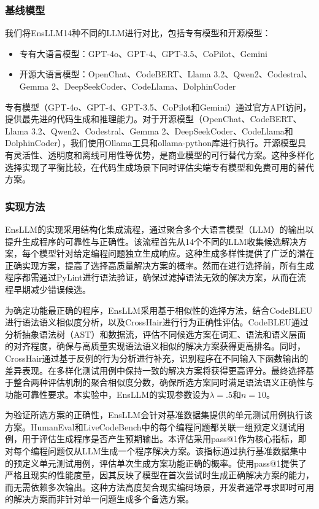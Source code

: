 \documentclass{article}
\newcommand{\tool}{EnsLLM}
\begin{document}
\subsubsection{基线模型}
\leavevmode\par
我们将\tool\与14种不同的LLM进行对比，包括专有模型和开源模型：
\begin{itemize}
    \item 专有大语言模型：GPT-4o、GPT-4、GPT-3.5、CoPilot、Gemini
    \item 开源大语言模型：OpenChat、CodeBERT、Llama 3.2、Qwen2、Codestral、Gemma 2、DeepSeekCoder、CodeLlama、DolphinCoder
\end{itemize}

专有模型（GPT-4o、GPT-4、GPT-3.5、CoPilot和Gemini）通过官方API访问，提供最先进的代码生成和推理能力。对于开源模型（OpenChat、CodeBERT、Llama 3.2、Qwen2、Codestral、Gemma 2、DeepSeekCoder、CodeLlama和DolphinCoder），我们使用Ollama工具和ollama-python库进行执行。开源模型具有灵活性、透明度和离线可用性等优势，是商业模型的可行替代方案。这种多样化选择实现了平衡比较，在代码生成场景下同时评估尖端专有模型和免费可用的替代方案。
\subsubsection{实现方法}
\leavevmode\par
\tool 的实现采用结构化集成流程，通过聚合多个大语言模型（LLM）的输出以提升生成程序的可靠性与正确性。该流程首先从14个不同的LLM收集候选解决方案，每个模型针对给定编程问题独立生成响应。这种生成多样性提供了广泛的潜在正确实现方案，提高了选择高质量解决方案的概率。然而在进行选择前，所有生成程序都需通过PyLint进行语法验证，确保过滤掉语法无效的解决方案，从而在流程早期减少错误候选。

为确定功能最正确的程序，\tool 采用基于相似性的选择方法，结合CodeBLEU进行语法语义相似度分析，以及CrossHair进行行为正确性评估。CodeBLEU通过分析抽象语法树（AST）和数据流，评估不同候选方案在词汇、语法和语义层面的对齐程度，确保与高质量实现语法语义相似的解决方案获得更高排名。同时，CrossHair通过基于反例的行为分析进行补充，识别程序在不同输入下函数输出的差异表现。在多样化测试用例中保持一致的解决方案将获得更高评分。最终选择基于整合两种评估机制的聚合相似度分数，确保所选方案同时满足语法语义正确性与功能可靠性要求。本实验中，\tool 的实现参数设为$\lambda = .5$和$n = 10$。

为验证所选方案的正确性，\tool 会针对基准数据集提供的单元测试用例执行该方案。HumanEval和LiveCodeBench中的每个编程问题都关联一组预定义测试用例，用于评估生成程序是否产生预期输出。本评估采用pass@1作为核心指标，即对每个编程问题仅从LLM生成一个程序解决方案。该指标通过执行基准数据集中的预定义单元测试用例，评估单次生成方案功能正确的概率。使用pass@1提供了严格且现实的性能度量，因其反映了模型在首次尝试时生成正确解决方案的能力，而无需依赖多次输出。这种方法高度契合现实编码场景，开发者通常寻求即时可用的解决方案而非针对单一问题生成多个备选方案。
\end{document}
